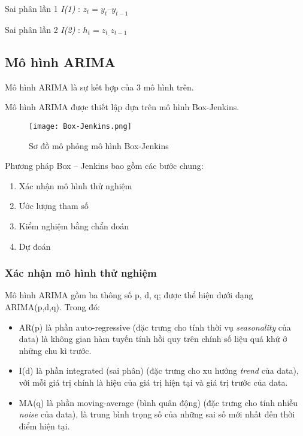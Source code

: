 \documentclass[12pt]{article}
\begin{document}
    Sai phân lần 1 \textit{I(1)} : $z_t = y_t – y_{t-1}$
    
    Sai phân lần 2 \textit{I(2)} : $h_t = z_t_ – z_{t-1}$

    \subsection{Mô hình ARIMA}
    
    Mô hình ARIMA là sự kết hợp của 3 mô hình trên.
    
    Mô hình ARIMA được thiết lập dựa trên mô hình Box-Jenkins.
    
    \begin{figure}[H]
        \centering
        \texttt{[image: Box-Jenkins.png]}
        \caption{Sơ đồ mô phỏng mô hình Box-Jenkins}
    \end{figure}
    
    Phương pháp Box – Jenkins bao gồm các bước chung:
    \begin{enumerate}
        \item Xác nhận mô hình thử nghiệm
        \item Ước lượng tham số
        \item Kiểm nghiệm bằng chẩn đoán
        \item Dự đoán
    \end{enumerate}

        \subsubsection{Xác nhận mô hình thử nghiệm}
        Mô hình ARIMA gồm ba thông số p, d, q; được thể hiện dưới dạng ARIMA(p,d,q). Trong đó:
    
        \begin{itemize}
            \item AR(p) là phần auto-regressive (đặc trưng cho tính thời vụ \emph{seasonality} của data) là không gian hàm tuyến tính hồi quy trên chính số liệu quá khứ ở những chu kì trước.
            \item I(d) là phần integrated (sai phân) (đặc trưng cho xu hướng \emph{trend} của data), với mỗi giá trị chính là hiệu của giá trị hiện tại và giá trị trước của data.
            \item MA(q) là phần moving-average (bình quân động) (đặc trưng cho tính nhiễu \emph{noise} của data), là trung bình trọng số của những sai số mới nhất đến thời điểm hiện tại.
        \end{itemize}
\end{document}
